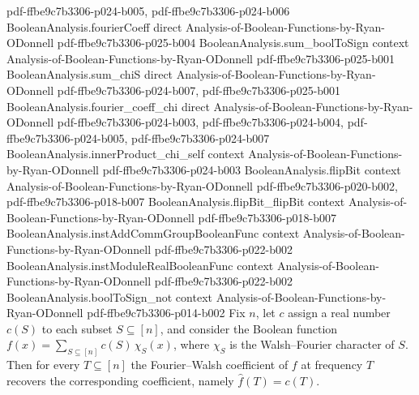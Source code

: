 \begin{lemma}
  {pdf-ffbe9c7b3306-p024-b005,
    pdf-ffbe9c7b3306-p024-b006}
\proofstep
  {BooleanAnalysis.fourierCoeff}
  {direct}
  {Analysis-of-Boolean-Functions-by-Ryan-ODonnell}
  {pdf-ffbe9c7b3306-p025-b004}
\proofstep
  {BooleanAnalysis.sum_boolToSign}
  {context}
  {Analysis-of-Boolean-Functions-by-Ryan-ODonnell}
  {pdf-ffbe9c7b3306-p025-b001}
\proofstep
  {BooleanAnalysis.sum_chiS}
  {direct}
  {Analysis-of-Boolean-Functions-by-Ryan-ODonnell}
  {pdf-ffbe9c7b3306-p024-b007,
    pdf-ffbe9c7b3306-p025-b001}
\proofstep
  {BooleanAnalysis.fourier_coeff_chi}
  {direct}
  {Analysis-of-Boolean-Functions-by-Ryan-ODonnell}
  {pdf-ffbe9c7b3306-p024-b003,
    pdf-ffbe9c7b3306-p024-b004,
    pdf-ffbe9c7b3306-p024-b005,
    pdf-ffbe9c7b3306-p024-b007}
\proofstep
  {BooleanAnalysis.innerProduct_chi_self}
  {context}
  {Analysis-of-Boolean-Functions-by-Ryan-ODonnell}
  {pdf-ffbe9c7b3306-p024-b003}
\proofstep
  {BooleanAnalysis.flipBit}
  {context}
  {Analysis-of-Boolean-Functions-by-Ryan-ODonnell}
  {pdf-ffbe9c7b3306-p020-b002,
    pdf-ffbe9c7b3306-p018-b007}
\proofstep
  {BooleanAnalysis.flipBit_flipBit}
  {context}
  {Analysis-of-Boolean-Functions-by-Ryan-ODonnell}
  {pdf-ffbe9c7b3306-p018-b007}
\proofstep
  {BooleanAnalysis.instAddCommGroupBooleanFunc}
  {context}
  {Analysis-of-Boolean-Functions-by-Ryan-ODonnell}
  {pdf-ffbe9c7b3306-p022-b002}
\proofstep
  {BooleanAnalysis.instModuleRealBooleanFunc}
  {context}
  {Analysis-of-Boolean-Functions-by-Ryan-ODonnell}
  {pdf-ffbe9c7b3306-p022-b002}
\proofstep
  {BooleanAnalysis.boolToSign_not}
  {context}
  {Analysis-of-Boolean-Functions-by-Ryan-ODonnell}
  {pdf-ffbe9c7b3306-p014-b002}
Fix $n$, let $c$ assign a real number $c(S)$ to each subset $S \subseteq [n]$, and
consider the Boolean function $f(x) = \sum_{S \subseteq [n]} c(S)\,\chi_S(x)$, where
$\chi_S$ is the Walsh--Fourier character of $S$. Then for every $T \subseteq [n]$ the
Fourier--Walsh coefficient of $f$ at frequency $T$ recovers the corresponding
coefficient, namely $\hat f(T) = c(T)$.
\end{lemma}

